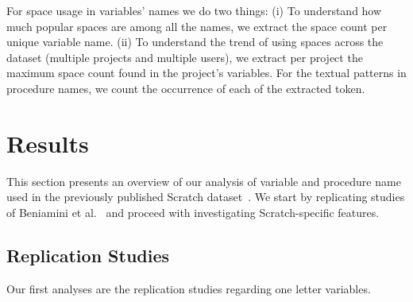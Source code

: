 \documentclass[conference]{IEEEtran}
\begin{document}
For space usage in variables' names we do two things: (i) To understand how much popular spaces are among all the names, we extract the space count per unique variable name. (ii) To understand the trend of using spaces across the dataset (multiple projects and multiple users), we extract per project the maximum space count found in the project's variables. For the textual patterns in procedure names, we count the occurrence of each of the extracted token. 

 \section{Results}
This section presents an overview of our analysis of variable and procedure name used in the previously published Scratch dataset~\cite{Aivaloglou2016HowKC}. 
We start by replicating studies of Beniamini et al.~\cite{Beniamini} and proceed with investigating Scratch-specific features.

\subsection{Replication Studies}
Our first analyses are the replication studies regarding one letter variables.
\end{document}
